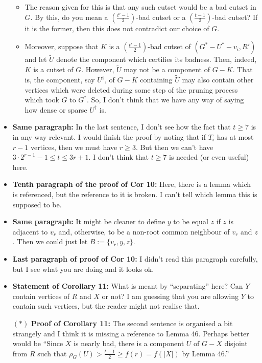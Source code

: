 \documentclass[11 pt]{article}
\begin{document}
\begin{itemize}
\begin{itemize}
\item The reason given for this is that any such cutset would be a bad cutset in $G$. By this, do you mean a $\left(\frac{t'-1}{2}\right)$-bad cutset or a $\left(\frac{t-1}{2}\right)$-bad cutset? If it is the former, then this does not contradict our choice of $G$. 
\item Moreover, suppose that $K$ is a $\left(\frac{t'-1}{2}\right)$-bad cutset of $(G^*-U^*-v_i,R')$ and let $\tilde{U}$ denote the component which certifies its badness. Then, indeed, $K$ is a cutset of $G$. However, $\tilde{U}$ may not be a component of $G-K$. That is, the component, say $U^\dagger$, of $G-K$ containing $\tilde{U}$ may also contain other vertices which were deleted during some step of the pruning process which took $G$ to $G^*$. So, I don't think that we have any way of saying how dense or sparse $U^\dagger$ is. 
\end{itemize}
\item \textbf{Same paragraph:} In the last sentence, I don't see how the fact that $t\geq7$ is in any way relevant. I would finish the proof by noting that if $T_i$ has at most $r-1$ vertices, then we must have $r\geq3$. But then we can't have $3\cdot 2^{r-1} - 1 \leq t\leq 3r+1$. I don't think that $t\geq7$ is needed (or even useful) here.
\item \textbf{Tenth paragraph of the proof of Cor 10:} Here, there is a lemma which is referenced, but the reference to it is broken. I can't tell which lemma this is supposed to be. 
\item \textbf{Same paragraph:} It might be cleaner to define $y$ to be equal $z$ if $z$ is adjacent to $v_r$ and, otherwise, to be a non-root common neighbour of $v_r$ and $z$. Then we could just let $B:=\{v_r,y,z\}$. 
\item \textbf{Last paragraph of proof of Cor 10:} I didn't read this paragraph carefully, but I see what you are doing and it looks ok. 
\item \textbf{Statement of Corollary 11:} What is meant by ``separating'' here? Can $Y$ contain vertices of $R$ and $X$ or not? I am guessing that you are allowing $Y$ to contain such vertices, but the reader might not realise that. 
\item[$\boldsymbol{(*)}$] \textbf{Proof of Corollary 11:} The second sentence is organised a bit strangely and I think it is missing a reference to Lemma 46. Perhaps better would be ``Since $X$ is nearly bad, there is a component $U$ of $G-X$ disjoint from $R$ such that $\rho_G(U)> \frac{t-1}{2}\geq f(r) =f(|X|)$ by Lemma 46.''

\end{itemize}
\end{document}

